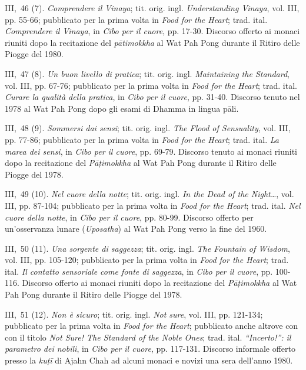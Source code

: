 III,~46 (7). \emph{Comprendere il Vinaya}; tit. orig. ingl.
\emph{Understanding Vinaya}, vol. III, pp. 55-66; pubblicato per la
prima volta in \emph{Food for the Heart}; trad. ital. \emph{Comprendere
il Vinaya}, in \emph{Cibo per il cuore}, pp. 17-30. Discorso offerto ai
monaci riuniti dopo la recitazione del \emph{pātimokkha} al Wat Pah Pong
durante il Ritiro delle Piogge del 1980.

III,~47 (8). \emph{Un buon livello di pratica}; tit. orig. ingl.
\emph{Maintaining the Standard}, vol. III, pp. 67-76; pubblicato per la
prima volta in \emph{Food for the Heart}; trad. ital. \emph{Curare la
qualità della pratica}, in \emph{Cibo per il cuore}, pp. 31-40. Discorso
tenuto nel 1978 al Wat Pah Pong dopo gli esami di Dhamma in lingua pāli.

III,~48 (9). \emph{Sommersi dai sensi}; tit. orig. ingl. \emph{The Flood
of Sensuality}, vol. III, pp. 77-86; pubblicato per la prima volta in
\emph{Food for the Heart}; trad. ital. \emph{La marea dei sensi}, in
\emph{Cibo per il cuore}, pp. 69-79. Discorso tenuto ai monaci riuniti
dopo la recitazione del \emph{Pāṭimokkha} al Wat Pah Pong durante il
Ritiro delle Piogge del 1978.

III,~49 (10). \emph{Nel cuore della notte}; tit. orig. ingl. \emph{In
the Dead of the Night\ldots{}}, vol. III, pp. 87-104; pubblicato per la prima
volta in \emph{Food for the Heart}; trad. ital. \emph{Nel cuore della
notte}, in \emph{Cibo per il cuore}, pp. 80-99. Discorso offerto per
un'osservanza lunare (\emph{Uposatha}) al Wat Pah Pong verso la fine del
1960.

III,~50 (11). \emph{Una sorgente di saggezza}; tit. orig. ingl.
\emph{The Fountain of Wisdom}, vol. III, pp. 105-120; pubblicato per la
prima volta in \emph{Food for the Heart}; trad. ital. \emph{Il contatto
sensoriale come fonte di saggezza}, in \emph{Cibo per il cuore}, pp.
100-116. Discorso offerto ai monaci riuniti dopo la recitazione del
\emph{Pāṭimokkha} al Wat Pah Pong durante il Ritiro delle Piogge del
1978.

III,~51 (12). \emph{Non è sicuro}; tit. orig. ingl. \emph{Not sure},
vol. III, pp. 121-134; pubblicato per la prima volta in \emph{Food for
the Heart}; pubblicato anche altrove con con il titolo \emph{Not Sure!
The Standard of the Noble Ones}; trad. ital. \emph{``Incerto!'': il
parametro dei nobili}, in \emph{Cibo per il cuore}, pp. 117-131.
Discorso informale offerto presso la \emph{kuṭī} di Ajahn Chah ad alcuni
monaci e novizi una sera dell'anno 1980.

